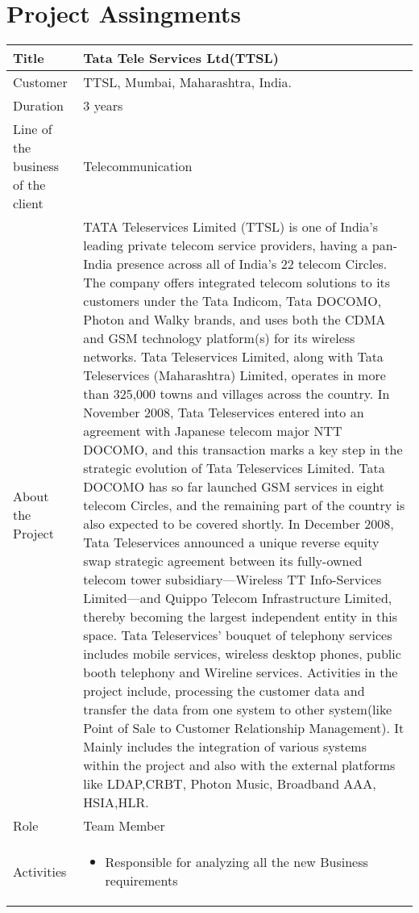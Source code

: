 \documentclass[2pt]{article}
\begin{document}
\renewcommand{\arraystretch}{2.5}
\section{Project Assingments}
\begin{tabular}{ |p{3cm}|p{11.5cm}|}
\hline
Title & Tata Tele Services Ltd(TTSL) \\
\hline
Customer & TTSL, Mumbai, Maharashtra, India. \\
\hline
Duration & 3 years \\
\hline
Line of the business of the client & Telecommunication \\
\hline
About the Project & TATA Teleservices Limited (TTSL) is one of India’s leading private telecom service providers, having a pan-India presence across all of India’s 22 telecom Circles. The company offers integrated telecom solutions to its customers under the Tata Indicom, Tata DOCOMO, Photon and Walky brands, and uses both the CDMA and GSM technology platform(s) for its wireless networks. Tata Teleservices Limited, along with Tata Teleservices (Maharashtra) Limited, operates in more than 325,000 towns and villages across the country. In November 2008, Tata Teleservices entered into an agreement with Japanese telecom major NTT DOCOMO, and this transaction marks a key step in the strategic evolution of Tata Teleservices Limited. Tata DOCOMO has so far launched GSM services in eight telecom Circles, and the remaining part of the country is also expected to be covered shortly. In December 2008, Tata Teleservices announced a unique reverse equity swap strategic agreement between its fully-owned telecom tower subsidiary—Wireless TT Info-Services Limited—and Quippo Telecom Infrastructure Limited, thereby becoming the largest independent entity in this space. Tata Teleservices’ bouquet of telephony services includes mobile services, wireless desktop phones, public booth telephony and Wireline services. Activities in the project include, processing the customer data and transfer the data from one system to other system(like Point of Sale to Customer Relationship Management). It Mainly includes the integration of various systems within the project and also with the external platforms like LDAP,CRBT, Photon Music, Broadband AAA, HSIA,HLR. \\
\hline
Role & Team Member \\
\hline
Activities &
\begin{itemize}
\item Responsible for analyzing all the new Business requirements

\end{itemize}
\end{tabular}
\end{document}
